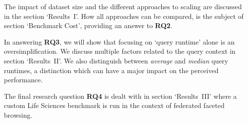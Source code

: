 The impact of dataset size and the different approaches to scaling are discussed in the section `Results~I'.
How all approaches can be compared, is the subject of section `Benchmark Cost', %
providing an answer to \textbf{RQ2}. 

In answering \textbf{RQ3}, we will show that focusing on `query runtime' alone is an oversimplification. We discuss multiple factors related to the query context in section `Results~II'. %
We also distinguish between \emph{average} and \emph{median} query runtimes, 
a distinction which can have a major impact on the perceived performance.

The final research question \textbf{RQ4} is dealt with in section `Results~III'
where a custom Life Sciences benchmark is run in the context of federated faceted browsing. 
